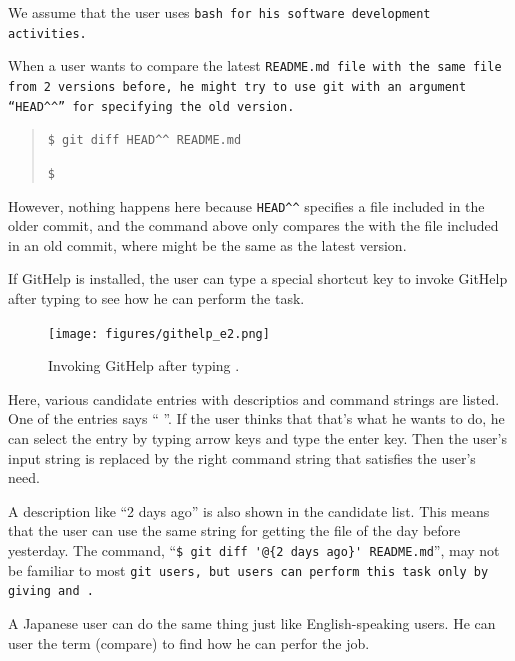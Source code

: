 \documentclass{sigchi}
\def\GH{\textsf{GitHelp}}
\begin{document}
We assume that the user uses \tt{bash} for his software
development activities.


When a user wants to compare the latest \tt{README.md} file
with the same file from 2 versions before,
he might try to use \tt{git} with an argument
``\verb|HEAD^^|''
for specifying the old version.

\begin{quotation}
  \verb|$ git diff HEAD^^ README.md|
  \par
  \verb|$|
\end{quotation}

However, nothing happens here because
\verb|HEAD^^|
specifies a file included in the older commit,
and the command above only compares the 
with the file included in an old commit, where
 might be the same as the latest version.

If {\GH} is installed,
the user can type a special shortcut key
to invoke {\GH} after typing  to see how he can
perform the task.

\begin{figure}[h]
  \texttt{[image: figures/githelp\_e2.png]}
  \caption{Invoking {\GH} after typing .}
  \label{bash1}
\end{figure}

Here, various candidate entries with
descriptios and command strings are listed.
One of the entries says
``  ''.
If the user thinks that that's what he wants to do,
he can select the entry by typing arrow keys and type the enter key.
Then the user's input string is replaced by the right command string
that satisfies the user's need.

A description like ``2 days ago'' is also shown in the candidate list.
This means that the user can use the same string 
for getting the  file of the day before yesterday.
The command,
``{\fontsize{9pt}{0pt}\selectfont\verb|$ git diff '@{2 days ago}' README.md|}'',
may not be familiar to most \tt{git} users,
but users can perform this task only by giving  and .

A Japanese  user can do the same thing just like
English-speaking users.
He can user the term (compare) to find how he can perfor the job.
\end{document}
